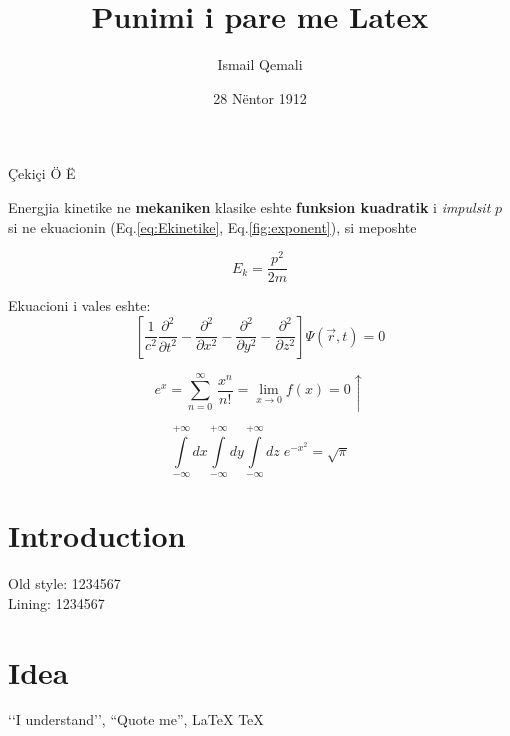 \documentclass{article}
\title{Punimi i pare me Latex}
\author{Ismail Qemali}
\date{28 N\"entor 1912}
\begin{document}
\maketitle

\c Ceki\c ci \"O \"E 

Energjia kinetike ne \textbf{mekaniken} klasike eshte {\bf funksion kuadratik} i {\it impulsit} $p$ si ne ekuacionin (Eq.\ref{eq:Ekinetike}, Eq.\ref{fig:exponent}), si meposhte

\begin{equation}
\label{eq:Ekinetike}
E_k = \frac{p^2}{2m}
\end{equation}

Ekuacioni i vales eshte:
\begin{equation}
\left[ \frac{1}{c^2} \frac{\partial^2}{\partial t^2} - \frac{\partial^2}{\partial x^2} - \frac{\partial^2}{\partial y^2} - \frac{\partial^2}{\partial z^2} \right] \Psi(\vec{r},t) = 0
\end{equation}

\begin{equation}
\label{fig:exponent}
e^x = \sum_{n=0}^\infty \, \frac{x^n}{n!} = \lim_{x\to 0} f(x) = 0\uparrow
\end{equation}

\begin{equation}
\int\limits_{-\infty}^{+\infty} dx \int\limits_{-\infty}^{+\infty} dy \int\limits_{-\infty}^{+\infty} dz \; e^{-x^2} = \sqrt{\pi}
\end{equation}

\newpage
\section{Introduction}
Old style: 1234567\\
Lining: 1234567

\section{Idea}
\lq\lq I understand\rq\rq,\; ``Quote me'', \LaTeX \; \TeX
\end{document}
